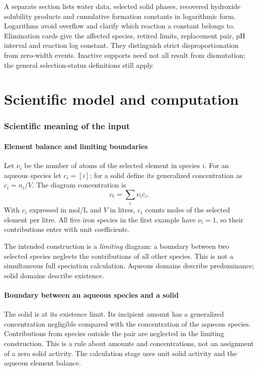 \documentclass[a4paper,11pt]{ltxdoc}
\begin{document}
A separate section lists water data, selected solid phases, recovered hydroxide
solubility products and cumulative formation constants in logarithmic form.
Logarithms avoid overflow and clarify which reaction a constant belongs to.
Elimination cards give the affected species, retired limits, replacement pair,
pH interval and reaction log constant. They distinguish strict disproportionation
from zero-width events. Inactive supports need not all result from dismutation;
the general selection-status definitions still apply.

\clearpage\part{Scientific model and computation}\label{part:science}
\section{Scientific meaning of the input}
\subsection{Element balance and limiting boundaries}
Let $\nu_i$ be the number of atoms of the selected element in species $i$. For an
aqueous species let $c_i=[i]$; for a solid define its generalized concentration as
$c_i=n_i/V$. The diagram concentration is
\[
  c_{\mathrm t}=\sum_i \nu_i c_i.
\]
With $c_i$ expressed in mol/L and $V$ in litres, $c_{\mathrm t}$ counts moles of the
selected element per litre. All five iron species in the first example have
$\nu_i=1$, so their contributions enter with unit coefficients.

The intended construction is a \emph{limiting} diagram: a boundary between two
selected species neglects the contributions of all other species. This is not a
simultaneous full speciation calculation. Aqueous domains describe predominance;
solid domains describe existence.

\subsection{Boundary between an aqueous species and a solid}
The solid is at its existence limit. Its incipient amount has a generalized
concentration negligible compared with the concentration of the aqueous species.
Contributions from species outside the pair are neglected in the limiting
construction. This is a rule about amounts and concentrations, not an assignment
of a zero solid activity. The calculation stage uses unit solid activity and the aqueous element balance.
\end{document}
